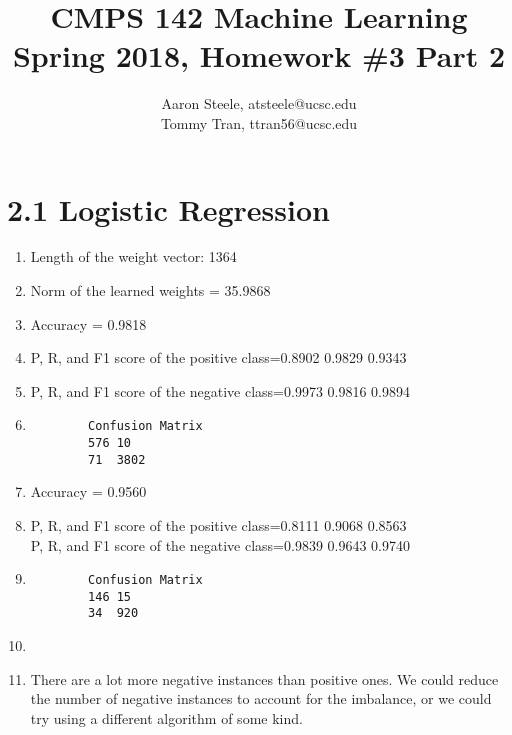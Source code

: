 \documentclass[12pt]{article}
\title{\textbf{CMPS 142 Machine Learning\\ Spring 2018, Homework \#3 Part 2}}
\date{}
\author{Aaron Steele, atsteele@ucsc.edu\\
	Tommy Tran, ttran56@ucsc.edu}
\begin{document}
	
	\maketitle	
	\section*{2.1 Logistic Regression}
	\begin{enumerate}
		\item Length of the weight vector: 1364
		\item Norm of the learned weights = 35.9868
		\item Accuracy = 0.9818
		\item P, R, and F1 score of the positive class=0.8902 0.9829 0.9343
		\item P, R, and F1 score of the negative class=0.9973 0.9816 0.9894
		\item \begin{verbatim}
		Confusion Matrix
		576	10
		71	3802
		\end{verbatim}
		
		\item Accuracy = 0.9560
		\item P, R, and F1 score of the positive class=0.8111 0.9068 0.8563 \\
		P, R, and F1 score of the negative class=0.9839 0.9643 0.9740
	
		\item \begin{verbatim}
		Confusion Matrix
		146	15
		34	920
		\end{verbatim}
		
		\item 
		
		\item There are a lot more negative instances than positive ones. We could reduce the number of negative instances to account for the imbalance, or we could try using a different algorithm of some kind.
	\end{enumerate}
	
\end{document}
